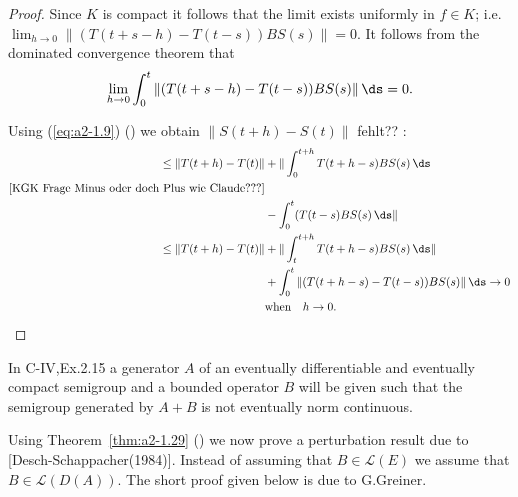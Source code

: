 \begin{theorem}
\begin{proof}
Since $K$ is compact it follows that the limit exists uniformly in $f \in K$; i.e. 
$\lim_{h \to 0} \|(T(t+s-h) - T(t-s))BS(s)\| = 0$.
It follows from the dominated convergence theorem that
\begin{equation}\label{eq:a2-1.13}
    \lim_{h \to 0} \int_{0}^{t} \|(T(t+s-h) - T(t-s))BS(s)\|\, \ds = 0.
\end{equation}
 
Using  (\eqref{eq:a2-1.9}) () we obtain $\|S(t+h) - S(t)\|$ 
  fehlt?? :
\begin{align*}
\leq \|T(t+h) - T(t)\| &+ \|\int_{0}^{t+h} T(t+h-s)BS(s)\, \ds\ \hfill \\
\text{[KGK Frage Minus oder doch Plus wie Claude???]}\\
 &- \int_{0}^{t} (T(t-s)BS(s)\, \ds\| \hfill \\
\leq \|T(t+h) - T(t)\| &+ \|\int_{t}^{t+h} T(t+h-s)BS(s)\, \ds\| \hfill \\ 
 &+ \int_{0}^{t} \|(T(t+h-s) - T(t-s))BS(s)\|\, \ds \to 0 \hfill \\
 &\text{when}  \quad h \to 0. \hfill \\	
\end{align*}
\end{proof}
\end{theorem}
In C-IV,Ex.2.15 a generator $A$ of an eventually differentiable and eventually compact semigroup and a bounded operator $B$ will be given such that the semigroup generated by $A+B$ is not eventually norm continuous.

Using Theorem~\ref{thm:a2-1.29} () we now prove a perturbation result due to [Desch-Schappacher(1984)].
Instead of assuming that $B \in \mathcal{L}(E)$ we assume that $B \in \mathcal{L}(D(A))$.
The short proof given below is due to G.Greiner.

